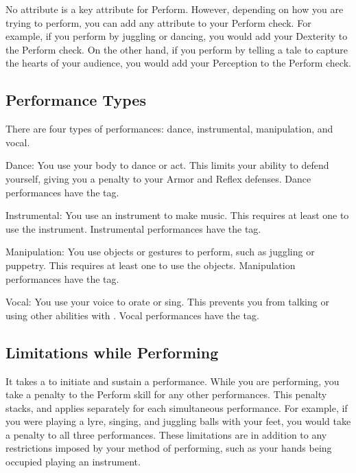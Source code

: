   No attribute is a key attribute for Perform.
  However, depending on how you are trying to perform, you can add any attribute to your Perform check.
  For example, if you perform by juggling or dancing, you would add your Dexterity to the Perform check.
  On the other hand, if you perform by telling a tale to capture the hearts of your audience, you would add your Perception to the Perform check.

  \subsection{Performance Types}\label{Performance Types}
    There are four types of performances: dance, instrumental, manipulation, and vocal.
    \begin{raggeditemize}
      \item Dance: You use your body to dance or act. This limits your ability to defend yourself, giving you a  penalty to your Armor and Reflex defenses. Dance performances have the \atVisual tag.
      \item Instrumental: You use an instrument to make music. This requires at least one  to use the instrument. Instrumental performances have the \atAuditory tag.
      \item Manipulation: You use objects or gestures to perform, such as juggling or puppetry. This requires at least one  to use the objects. Manipulation performances have the \atVisual tag.
      \item Vocal: You use your voice to orate or sing. This prevents you from talking or using other abilities with . Vocal performances have the \atAuditory tag.
    \end{raggeditemize}

  \subsection{Limitations while Performing}
    It takes a  to initiate and sustain a performance.
    While you are performing, you take a  penalty to the Perform skill for any other performances.
    This penalty stacks, and applies separately for each simultaneous performance.
    For example, if you were playing a lyre, singing, and juggling balls with your feet, you would take a  penalty to all three performances.
    These limitations are in addition to any restrictions imposed by your method of performing, such as your hands being occupied playing an instrument.

